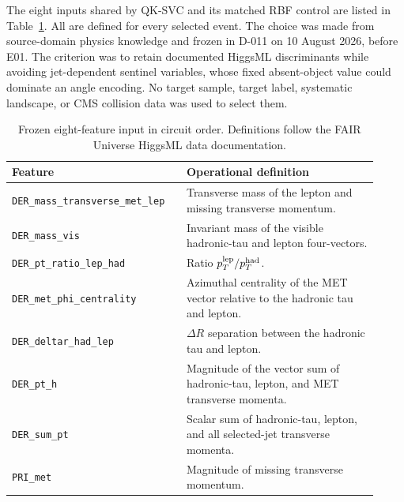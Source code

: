 \documentclass[11pt,a4paper]{article}
\begin{document}
The eight inputs shared by QK-SVC and its matched RBF control are listed in
Table~\ref{tab:features}. All are defined for every selected event. The choice
was made from source-domain physics knowledge and frozen in D-011 on 10 August
2026, before E01. The criterion was to retain documented HiggsML discriminants
while avoiding jet-dependent sentinel variables, whose fixed absent-object
value could dominate an angle encoding. No target sample, target label,
systematic landscape, or CMS collision data was used to select them.

\begin{table}[H]
\centering
\small
\caption{Frozen eight-feature input in circuit order. Definitions follow the
FAIR Universe HiggsML data documentation.}
\label{tab:features}
\begin{tabular}{>{\raggedright\arraybackslash}p{0.43\linewidth}>{\raggedright\arraybackslash}p{0.49\linewidth}}
\toprule
Feature & Operational definition \\
\midrule
\texttt{DER\_mass\_transverse\_met\_lep} & Transverse mass of the lepton and missing transverse momentum. \\
\texttt{DER\_mass\_vis} & Invariant mass of the visible hadronic-tau and lepton four-vectors. \\
\texttt{DER\_pt\_ratio\_lep\_had} & Ratio $p_T^{\rm lep}/p_T^{\rm had}$. \\
\texttt{DER\_met\_phi\_centrality} & Azimuthal centrality of the MET vector relative to the hadronic tau and lepton. \\
\texttt{DER\_deltar\_had\_lep} & $\Delta R$ separation between the hadronic tau and lepton. \\
\texttt{DER\_pt\_h} & Magnitude of the vector sum of hadronic-tau, lepton, and MET transverse momenta. \\
\texttt{DER\_sum\_pt} & Scalar sum of hadronic-tau, lepton, and all selected-jet transverse momenta. \\
\texttt{PRI\_met} & Magnitude of missing transverse momentum. \\
\bottomrule
\end{tabular}
\end{table}
\end{document}
